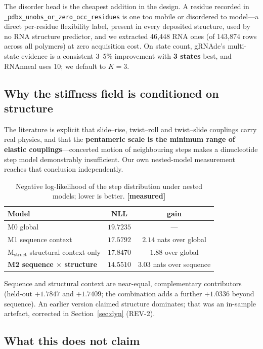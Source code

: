 \documentclass[11pt,a4paper]{article}
\newcommand{\meas}{\textcolor{measured}{\textbf{[measured]}}}
\begin{document}
The disorder head is the cheapest addition in the design. A residue recorded in
\texttt{\_pdbx\_unobs\allowbreak\_or\allowbreak\_zero\allowbreak\_occ\allowbreak\_residues} is one too mobile or disordered to
model---a direct per-residue flexibility label, present in every deposited
structure, used by no RNA structure predictor, and we extracted 46,448 RNA ones (of 143,874 rows across all polymers)
at zero acquisition cost. On state count, gRNAde's multi-state evidence is a
consistent 3--5\% improvement with \textbf{3 states} best, and RNAnneal uses 10;
we default to $K=3$.

\subsection{Why the stiffness field is conditioned on structure}

The literature is explicit that slide--rise, twist--roll and twist--slide
couplings carry real physics, and that the \textbf{pentameric scale is the
minimum range of elastic couplings}---concerted motion of neighbouring steps makes
a dinucleotide step model demonstrably insufficient. Our own nested-model
measurement reaches that conclusion independently.

\begin{table}[h]
\centering
\caption{Negative log-likelihood of the step distribution under nested models;
lower is better. \meas}
\begin{tabular}{lcc}
\toprule
\textbf{Model} & \textbf{NLL} & \textbf{gain} \\
\midrule
M0 global & $19.7235$ & --- \\
M1 sequence context & $17.5792$ & $2.14$ nats over global \\
M$_{\text{struct}}$ structural context only & $17.8470$ & $1.88$ over global \\
\textbf{M2 sequence $\times$ structure} & $\mathbf{14.5510}$ & $\mathbf{3.03}$ nats over sequence \\
\bottomrule
\end{tabular}
\end{table}

Sequence and structural context are near-equal, complementary contributors
(held-out $+1.7847$ and $+1.7409$; the combination adds a further $+1.0336$
beyond sequence). An earlier version claimed structure dominates; that was an
in-sample artefact, corrected in Section~\ref{sec:dyn} (REV-2).

\subsection{What this does not claim}
\end{document}
